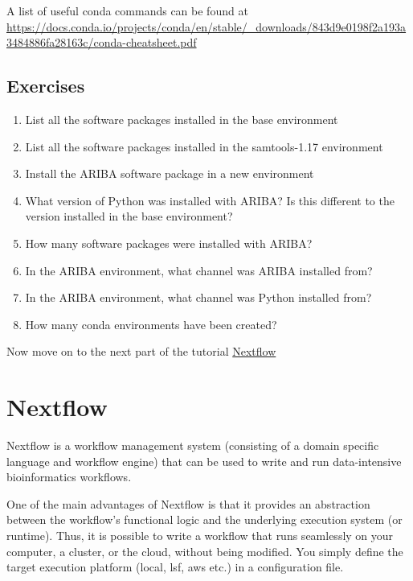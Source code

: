 \documentclass[11pt]{article}
\providecommand{\tightlist}{%
      \setlength{\itemsep}{0pt}\setlength{\parskip}{0pt}}
\begin{document}
A list of useful conda commands can be found at
\url{https://docs.conda.io/projects/conda/en/stable/_downloads/843d9e0198f2a193a3484886fa28163c/conda-cheatsheet.pdf}

    \hypertarget{exercises}{%
\subsection{Exercises}\label{exercises}}

\begin{enumerate}
\def\labelenumi{\arabic{enumi}.}
\tightlist
\item
  List all the software packages installed in the base environment
\item
  List all the software packages installed in the samtools-1.17
  environment
\item
  Install the ARIBA software package in a new environment
\item
  What version of Python was installed with ARIBA? Is this different to
  the version installed in the base environment?
\item
  How many software packages were installed with ARIBA?
\item
  In the ARIBA environment, what channel was ARIBA installed from?
\item
  In the ARIBA environment, what channel was Python installed from?
\item
  How many conda environments have been created?
\end{enumerate}

    Now move on to the next part of the tutorial
\href{nextflow.ipynb}{Nextflow}





\newpage





    \hypertarget{nextflow}{%
\section{Nextflow}\label{nextflow}}

Nextflow is a workflow management system (consisting of a domain
specific language and workflow engine) that can be used to write and run
data-intensive bioinformatics workflows.

One of the main advantages of Nextflow is that it provides an
abstraction between the workflow's functional logic and the underlying
execution system (or runtime). Thus, it is possible to write a workflow
that runs seamlessly on your computer, a cluster, or the cloud, without
being modified. You simply define the target execution platform (local,
lsf, aws etc.) in a configuration file.
\end{document}

